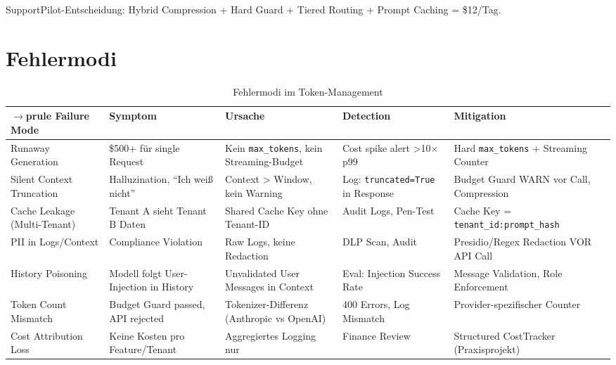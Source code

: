 SupportPilot-Entscheidung: Hybrid Compression + Hard Guard + Tiered Routing + Prompt Caching = \$12/Tag.


\section{Fehlermodi}
\label{sec:failure_modes}

\begin{table}[H]
\centering
\begin{tabularx}{\linewidth}{lXXXXX}
$\to$prule
\textbf{Failure Mode} & \textbf{Symptom} & \textbf{Ursache} & \textbf{Detection} & \textbf{Mitigation} \\
\midrule
Runaway Generation & \$500+ für single Request & Kein \texttt{max\_tokens}, kein Streaming-Budget & Cost spike alert >10$\times$ p99 & Hard \texttt{max\_tokens} + Streaming Counter \\
Silent Context Truncation & Halluzination, ``Ich weiß nicht'' & Context > Window, kein Warning & Log: \texttt{truncated=True} in Response & Budget Guard WARN vor Call, Compression \\
Cache Leakage (Multi-Tenant) & Tenant A sieht Tenant B Daten & Shared Cache Key ohne Tenant-ID & Audit Logs, Pen-Test & Cache Key = \texttt{tenant\_id:prompt\_hash} \\
PII in Logs/Context & Compliance Violation & Raw Logs, keine Redaction & DLP Scan, Audit & Presidio/Regex Redaction VOR API Call \\
History Poisoning & Modell folgt User-Injection in History & Unvalidated User Messages in Context & Eval: Injection Success Rate & Message Validation, Role Enforcement \\
Token Count Mismatch & Budget Guard passed, API rejected & Tokenizer-Differenz (Anthropic vs OpenAI) & 400 Errors, Log Mismatch & Provider-spezifischer Counter \\
Cost Attribution Loss & Keine Kosten pro Feature/Tenant & Aggregiertes Logging nur & Finance Review & Structured CostTracker (Praxisprojekt) \\
\bottomrule
\end{tabularx}
\caption{Fehlermodi im Token-Management}
\label{tab:failure_modes}
\end{table}

